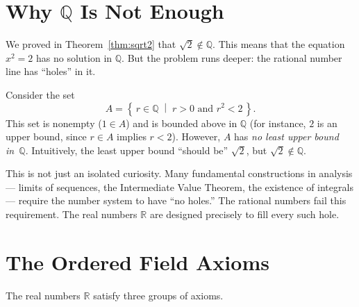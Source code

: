 \documentclass[12pt,a4paper,openany]{book}
\newcommand{\Q}{\mathbb{Q}}
\newcommand{\R}{\mathbb{R}}
\newcommand{\setcond}[2]{\left\{\,#1\;\middle|\;#2\,\right\}}
\theoremstyle{definition}
\theoremstyle{remark}
\begin{document}
\section{Why \texorpdfstring{$\Q$}{Q} Is Not Enough}
\label{sec:Q-not-enough}

We proved in Theorem~\ref{thm:sqrt2} that $\sqrt{2} \notin \Q$.  This means
that the equation $x^2 = 2$ has no solution in $\Q$.  But the problem runs
deeper: the rational number line has ``holes'' in it.

Consider the set
\[
  A = \setcond{r \in \Q}{r > 0 \text{ and } r^2 < 2}.
\]
This set is nonempty ($1 \in A$) and is bounded above in $\Q$ (for instance,
$2$ is an upper bound, since $r \in A$ implies $r < 2$).  However, $A$ has
\emph{no least upper bound in~$\Q$}.  Intuitively, the least upper bound
``should be'' $\sqrt{2}$, but $\sqrt{2} \notin \Q$.

This is not just an isolated curiosity.  Many fundamental constructions in
analysis --- limits of sequences, the Intermediate Value Theorem, the
existence of integrals --- require the number system to have ``no holes.''
The rational numbers fail this requirement.  The real numbers $\R$ are
designed precisely to fill every such hole.

\section{The Ordered Field Axioms}
\label{sec:field-axioms}

The real numbers $\R$ satisfy three groups of axioms.
\end{document}
